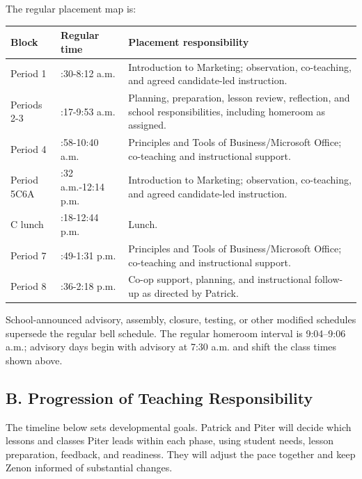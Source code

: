 \documentclass[10pt]{article}
\begin{document}
The regular placement map is:

\begin{longtable}{@{}>{\RaggedRight\arraybackslash}p{}>{\RaggedRight\arraybackslash}p{}p{}@{}}
\toprule
\textbf{Block} & \textbf{Regular time} & \textbf{Placement responsibility} \\
\midrule
\endhead
Period 1 & 7:30-8:12 a.m. & Introduction to Marketing; observation, co-teaching, and agreed candidate-led instruction. \\
Periods 2-3 & 8:17-9:53 a.m. & Planning, preparation, lesson review, reflection, and school responsibilities, including homeroom as assigned. \\
Period 4 & 9:58-10:40 a.m. & Principles and Tools of Business/Microsoft Office; co-teaching and instructional support. \\
Period 5C6A & 11:32 a.m.-12:14 p.m. & Introduction to Marketing; observation, co-teaching, and agreed candidate-led instruction. \\
C lunch & 12:18-12:44 p.m. & Lunch. \\
Period 7 & 12:49-1:31 p.m. & Principles and Tools of Business/Microsoft Office; co-teaching and instructional support. \\
Period 8 & 1:36-2:18 p.m. & Co-op support, planning, and instructional follow-up as directed by Patrick. \\
\bottomrule
\end{longtable}

School-announced advisory, assembly, closure, testing, or other modified schedules supersede the regular bell schedule. The regular homeroom interval is 9:04--9:06 a.m.; advisory days begin with advisory at 7:30 a.m. and shift the class times shown above.

\subsection*{B. Progression of Teaching Responsibility}

The timeline below sets developmental goals. Patrick and Piter will decide which lessons and classes Piter leads within each phase, using student needs, lesson preparation, feedback, and readiness. They will adjust the pace together and keep Zenon informed of substantial changes.
\end{document}

